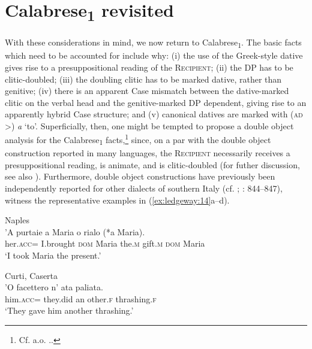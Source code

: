 \documentclass[output=paper,modfonts,nonflat,colorlinks,citecolor=brown]{langsci/langscibook}
\begin{document}
\section{Calabrese\textsubscript{1} revisited}

With these considerations in mind, we now return to Calabrese\textsubscript{1}. The basic facts which need to be accounted for include why: (i) the use of the Greek-style dative gives rise to a presuppositional reading of the \textsc{Recipient}; (ii) the DP has to be clitic-doubled; (iii) the doubling clitic has to be marked dative, rather than genitive; (iv) there is an apparent Case mismatch between the dative-marked clitic on the verbal head and the genitive-marked DP dependent, giving rise to an apparently hybrid Case structure; and (v) canonical datives are marked with (\textsc{ad} >) \textit{a} ‘to’. Superficially, then, one might be tempted to propose a double object analysis for the Calabrese\textsubscript{1} facts,\footnote{Cf. a.o. \citet{BarssLasnik1986,Larson1988, Larson1990,Jackendoff1990larson,CollinsThráinsson1993,Marantz1993,Demonte1995,Pesetsky1995,Collins1997,Torrego1998,Harley2002,Pyllkänen2008,Anagnostopoulou2003,Cuervo2003,Jeong2007,Bruening2010DOC, Bruening2010Ditrans,OrmazabalRomero2010,HarleyJung2015,Pineda2016}..} since, on a par with the double object construction reported in many languages, the \textsc{Recipient} necessarily receives a presuppositional reading, is animate, and is clitic-doubled (for futher discussion, see also ). Furthermore, double object constructions have previously been independently reported for other dialects of southern Italy (cf. \citealt[ch.2]{Ledgeway2000}; \citeyear{Ledgeway2009}: 844--847), witness the representative examples in (\ref{ex:ledgeway:14}a--d). 

\ea\label{ex:ledgeway:14}
\ea Naples\\

\gll ’A  purtaie  a  Maria  o  rialo  (*a  Maria).\\
    her.\textsc{acc}=  I.brought  \textsc{dom}  Maria  the.\textsc{m}  gift.\textsc{m}    \textsc{dom}  Maria\\
    \glt `I took Maria the present.'

\ex Curti, Caserta\\
    \gll ’O  facettero  n’  ata  paliata.\\
    him.\textsc{acc}=  they.did  an  other.\textsc{f}  thrashing.\textsc{f}\\
    \glt `They gave him another thrashing.'
\end{document}
